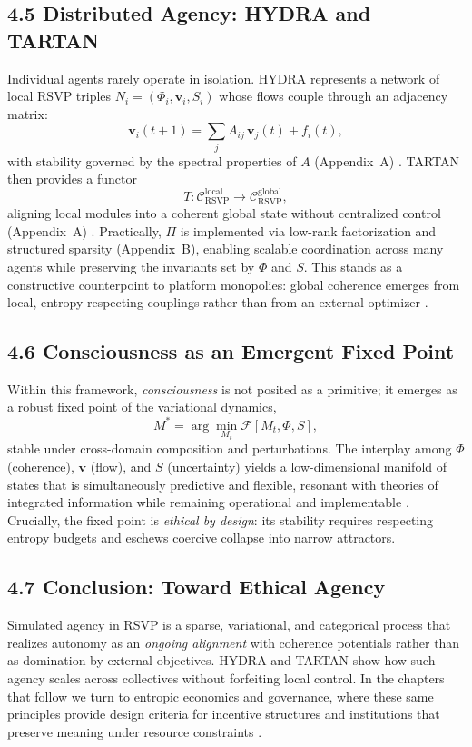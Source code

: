 \documentclass[12pt]{article}
\begin{document}
\subsection*{4.5 Distributed Agency: HYDRA and TARTAN}

Individual agents rarely operate in isolation. HYDRA represents a network of local RSVP triples \(N_i = (\Phi_i,\mathbf{v}_i,S_i)\) whose flows couple through an adjacency matrix:
\[
\mathbf{v}_i(t+1) = \sum_j A_{ij} \,\mathbf{v}_j(t) + f_i(t),
\]
with stability governed by the spectral properties of \(A\) (Appendix~A) \citep{bird1988}. TARTAN then provides a functor
\[
T : \mathcal{C}_{\text{RSVP}}^{\mathrm{local}} \to \mathcal{C}_{\text{RSVP}}^{\mathrm{global}},
\]
aligning local modules into a coherent global state without centralized control (Appendix~A) \citep{milewski2018}. Practically, \(\Pi\) is implemented via low-rank factorization and structured sparsity (Appendix~B), enabling scalable coordination across many agents while preserving the invariants set by \(\Phi\) and \(S\). This stands as a constructive counterpoint to platform monopolies: global coherence emerges from local, entropy-respecting couplings rather than from an external optimizer \citep{zuboff2019}.

\subsection*{4.6 Consciousness as an Emergent Fixed Point}

Within this framework, \emph{consciousness} is not posited as a primitive; it emerges as a robust fixed point of the variational dynamics,
\[
M^\ast = \arg\min_{M_t} \mathcal{F}[M_t,\Phi,S],
\]
stable under cross-domain composition and perturbations. The interplay among \(\Phi\) (coherence), \(\mathbf{v}\) (flow), and \(S\) (uncertainty) yields a low-dimensional manifold of states that is simultaneously predictive and flexible, resonant with theories of integrated information while remaining operational and implementable \citep{tononi2004, hohwy2013}. Crucially, the fixed point is \emph{ethical by design}: its stability requires respecting entropy budgets and eschews coercive collapse into narrow attractors.

\subsection*{4.7 Conclusion: Toward Ethical Agency}

Simulated agency in RSVP is a sparse, variational, and categorical process that realizes autonomy as an \emph{ongoing alignment} with coherence potentials rather than as domination by external objectives. HYDRA and TARTAN show how such agency scales across collectives without forfeiting local control. In the chapters that follow we turn to entropic economics and governance, where these same principles provide design criteria for incentive structures and institutions that preserve meaning under resource constraints \citep{hanson2003, ortega1957}.
\end{document}
